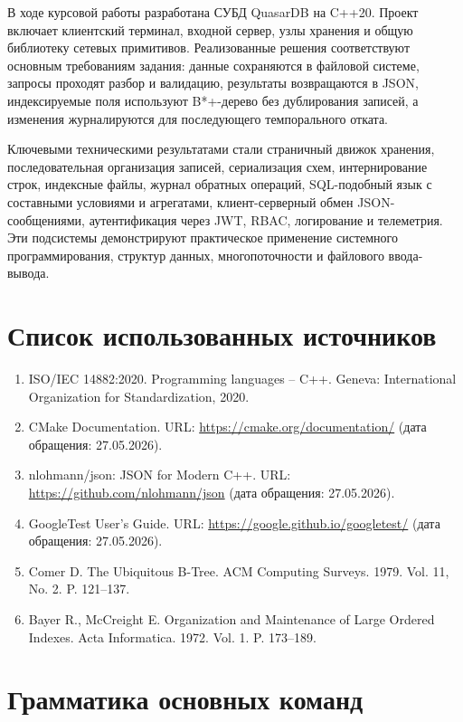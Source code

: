 \documentclass[a4paper,14pt]{extarticle}
\begin{document}
В ходе курсовой работы разработана СУБД QuasarDB на C++20. Проект включает клиентский терминал, входной сервер, узлы хранения и общую библиотеку сетевых примитивов. Реализованные решения соответствуют основным требованиям задания: данные сохраняются в файловой системе, запросы проходят разбор и валидацию, результаты возвращаются в JSON, индексируемые поля используют B*+-дерево без дублирования записей, а изменения журналируются для последующего темпорального отката.

Ключевыми техническими результатами стали страничный движок хранения, последовательная организация записей, сериализация схем, интернирование строк, индексные файлы, журнал обратных операций, SQL-подобный язык с составными условиями и агрегатами, клиент-серверный обмен JSON-сообщениями, аутентификация через JWT, RBAC, логирование и телеметрия. Эти подсистемы демонстрируют практическое применение системного программирования, структур данных, многопоточности и файлового ввода-вывода.

\clearpage
\section*{Список использованных источников}

\begin{enumerate}[label={\arabic*.}]
    \item ISO/IEC 14882:2020. Programming languages -- C++. Geneva: International Organization for Standardization, 2020.
    \item CMake Documentation. URL: \url{https://cmake.org/documentation/} (дата обращения: 27.05.2026).
    \item nlohmann/json: JSON for Modern C++. URL: \url{https://github.com/nlohmann/json} (дата обращения: 27.05.2026).
    \item GoogleTest User's Guide. URL: \url{https://google.github.io/googletest/} (дата обращения: 27.05.2026).
    \item Comer D. The Ubiquitous B-Tree. ACM Computing Surveys. 1979. Vol. 11, No. 2. P. 121--137.
    \item Bayer R., McCreight E. Organization and Maintenance of Large Ordered Indexes. Acta Informatica. 1972. Vol. 1. P. 173--189.
\end{enumerate}

\clearpage
\appendix
\renewcommand{\thesection}{\arabic{section}}
\section{Грамматика основных команд}
\end{document}
